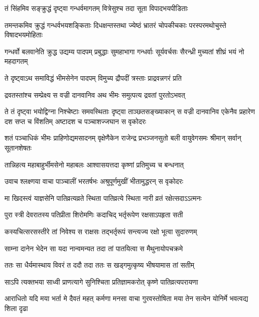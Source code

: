 \twolineshloka
{तं सिंहमिव सङ्क्रुद्धं दृष्ट्वा गन्धर्वमागतम्}
{वित्रेसुश्च तदा सूता विपादभयपीडिताः}


\threelineshloka
{तमन्तकमिव क्रुद्धं गन्धर्वभयशङ्किताः}
{दिधक्षन्तस्तथा ज्येष्ठं भ्रातरं चोपकीचकाः}
{परस्परमथोचुस्ते विषादभयमोहिताः}


\threelineshloka
{गन्धर्वो बलवानेति क्रुद्ध उद्यम्य पादपम्}
{प्रबुद्धाः सुमहाभागा गन्धर्वाः सूर्यवर्चसः}
{सैरन्ध्री मुच्यतां शीघ्रं भयं नो महदागतम्}



\twolineshloka
{ते दृष्ट्वाऽथ समाविद्धं भीमसेनेन पादपम्}
{विमुच्य द्रौपदीं त्रस्ताः प्राद्रवन्नगरं प्रति}


\twolineshloka
{द्रवतस्तांश्च सम्प्रेक्ष्य स वज्री दानवानिव}
{अथ भीमः समुत्पत्य द्रवतां पुरतोऽभवत्}


\onelineshloka
{ते तं दृष्ट्वा भयोद्विग्ना निश्चेष्टाः समवस्थिताः}
\threelineshloka
{दृष्ट्वा ताञ्छतसङ्ख्याकान् स वज्री दानवानिव}
{एकेनैव प्रहारेण दश सप्त च विंशतिम्}
{अष्टादश च पञ्चाशज्जघान स वृकोदरः}


\threelineshloka
{शतं पञ्चाधिकं भीमः प्राहिणोद्यमसादनम्}
{वृक्षेणैकेन राजेन्द्र प्रभञ्जनसुतो बली}
{वायुवेगसमः श्रीमान् सर्वान् सूतानशेषतः}


\twolineshloka
{तान्निहत्य महाबाहुर्भीमसेनो महाबलः}
{आश्वासयत्तदा कृष्णां प्रतिमुच्य च बन्धनात्}


\twolineshloka
{उवाच श्लक्ष्णया वाचा पाञ्चालीं भरतर्षभः}
{अश्रुपूर्णमुखीं भीतामुद्धरन् स वृकोदरः}


\twolineshloka
{मा खिदस्त्वं याज्ञसेनि पातिव्रत्यव्रते स्थिता}
{पातिव्रत्ये स्थिता नारी व्रतं रक्षेत्सदाऽऽत्मनः}


\twolineshloka
{पुरा स्त्री देवरातस्य पतिप्रीता शिरोमणिः}
{कदाचिद् भर्तृरूपेण रक्षसाऽपहृता सती}


\twolineshloka
{कस्यचित्सरसस्तीरे तां निवेश्य स राक्षसः}
{तद्भर्तृरूपं सन्त्यज्य रक्षो भूत्वा सुदारुणम्}


\twolineshloka
{साम्ना दानेन भेदेन सा यदा नान्वमन्यत}
{तदा तां पातयित्वा स मैथुनायोपचक्रमे}


\twolineshloka
{ततः सा धैर्यमास्थाय विवरं त ददौ तदा}
{ततः स खड्गमुत्कृष्य भीषयामास तां सतीम्}


\twolineshloka
{साऽपि त्यक्तभया साध्वी प्राणत्यागे सुनिश्चिता}
{प्रतिज्ञामकरोत् कृष्णे पातिव्रत्यपरायणा}


\threelineshloka
{आराधितो यदि मया भर्ता मे दैवतं महत्}
{कर्मणा मनसा वाचा गुरवस्तोषिता मया}
{तेन सत्येन योनिर्मे भवत्वद्य शिला दृढा}


